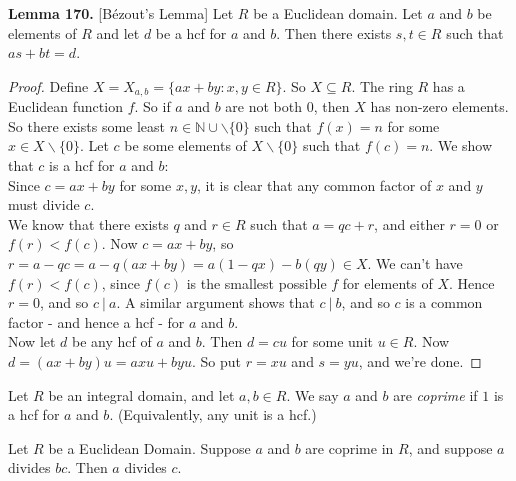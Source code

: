  \noindent \textbf{Lemma 170.} [B\'{e}zout's Lemma]  Let $R$ be a Euclidean domain. Let $a$ and $b$ be elements of $R$ and let $d$ be a hcf for $a$ and $b$. Then there exists $s,t\in R$ such that $as + bt = d$.
 
 \begin{proof}
 	Define $X = X_{a,b} = \{ax + by : x,y \in R\}$. So $X \subseteq R$. The ring $R$ has a Euclidean function $f$. So if $a$ and $b$ are not both $0$, then $X$ has non-zero elements. So there exists some least $n \in \mathbb{N}\cup\backslash\{0\}$ such that $f(x) = n$ for some $x \in X\backslash\{0\}.$ Let $c$ be some elements of $X \backslash\{0\}$ such that $f(c) = n$. We show that $c$ is a hcf for $a$ and $b$:\\
 	
 	Since $c = ax + by$ for some $x,y$, it is clear that any common factor of $x$ and $y$ must divide $c$.\\
 	
 	We know that there exists $q$ and $r\in R$ such that $a = qc + r$, and either $ r = 0$ or $f(r) < f(c)$. Now $c = ax + by$, so $r = a -qc = a - q(ax + by) = a(1-qx) -b(qy) \in X$. We can't have $f(r) < f(c)$, since $f(c)$ is the smallest possible $f$ for elements of $X$. Hence $r = 0$, and so $c~|~ a$. A similar argument shows that $c ~|~ b$, and so $c$ is a common factor - and hence a hcf - for $a$ and $b$.\\
 	
 	Now let $d$ be any hcf of $a$ and $b$. Then $d =  cu$ for some unit $u \in R$. Now $d = (ax + by)u = axu + byu$. So put $r = xu$ and $s = yu$, and we're done.
 \end{proof}\vspace*{10pt}
 
 
 
 
 
\begin{definition}Let $R$ be an integral domain, and let $a,b \in R$. We say $a$ and $b$ are \emph{coprime}  if $1$ is a hcf for $a$ and $b$. (Equivalently, any unit is a hcf.)	
\end{definition}\vspace*{5pt}
 
 \begin{proposition} Let $R$ be a Euclidean Domain. Suppose $a$ and $b$ are coprime in $R$, and suppose $a$ divides $bc$. Then $a$ divides $c$.
\end{proposition}

